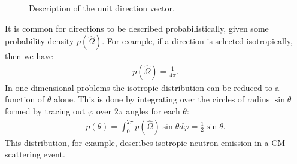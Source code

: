 \documentclass[11pt]{article}
\begin{document}
\begin{figure}
\centering
{}
\caption{Description of the unit direction vector.}
\label{fig::unitDirection}
\end{figure}

It is common for directions to be described probabilistically, given some probability density \(p\left(\hat{\Omega}\right)\).  For example, if a direction is selected isotropically, then we have
\begin{align}
  p\left(\hat{\Omega}\right) = \frac{1}{4\pi}.
\end{align}
In one-dimensional problems the isotropic distribution can be reduced to a function of \(\theta\) alone.  This is done by integrating over the circles of radius \(\sin\theta\) formed by tracing out \(\varphi\) over \(2\pi\) angles for each \(\theta\):
\begin{align}
  p(\theta) = \int_0^{2\pi} p\left(\hat{\Omega}\right) \sin\theta d\varphi
            = \frac{1}{2} \sin\theta.
\end{align}
This distribution, for example, describes isotropic neutron emission in a CM scattering event.
\end{document}
